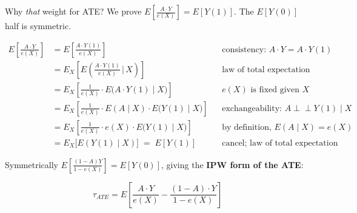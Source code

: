 \documentclass[
  11pt,
  ignorenonframetext,
  aspectratio=169,
]{beamer}
\newcommand{\indep}{\perp\!\!\!\perp}
\begin{document}
\begin{frame}{Why \emph{that} weight for ATE?}
\protect{}\label{why-that-weight-for-ate}
We prove \(E\!\left[\frac{A \cdot Y}{e(X)}\right] = E[Y(1)]\). The
\(E[Y(0)]\) half is symmetric.

\scriptsize

\[
\begin{aligned}
E\!\left[ \frac{A \cdot Y}{e(X)} \right]
  &= E\!\left[ \frac{A \cdot Y(1)}{e(X)} \right]
     && \text{consistency: } A \cdot Y = A \cdot Y(1) \\
  &= E_X\!\left[ E\!\left( \frac{A \cdot Y(1)}{e(X)} \,\Big|\, X \right) \right]
     && \text{law of total expectation} \\
  &= E_X\!\left[ \frac{1}{e(X)} \cdot E\big(A \cdot Y(1) \mid X\big) \right]
     && e(X) \text{ is fixed given } X \\
  &= E_X\!\left[ \frac{1}{e(X)} \cdot E(A \mid X) \cdot E\big(Y(1) \mid X\big) \right]
     && \text{exchangeability: } A \indep Y(1) \mid X \\
  &= E_X\!\left[ \frac{1}{e(X)} \cdot e(X) \cdot E\big(Y(1) \mid X\big) \right]
     && \text{by definition, } E(A \mid X) = e(X) \\
  &= E_X\big[ E(Y(1) \mid X) \big] \;=\; E[Y(1)]
     && \text{cancel; law of total expectation}
\end{aligned}
\] \normalsize

Symmetrically \(E\!\left[\frac{(1 - A) Y}{1 - e(X)}\right] = E[Y(0)]\),
giving the \textbf{IPW form of the ATE}:

\[
\tau_{ATE} = E\!\left[ \frac{A \cdot Y}{e(X)} - \frac{(1 - A) \cdot Y}{1 - e(X)} \right]
\]
\end{frame}
\end{document}
